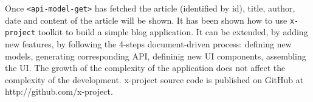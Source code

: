 Once \texttt{<api-model-get>} has fetched the article (identified by id), title, author, date and content of the article will be shown. It has been shown how to use \texttt{x-project} toolkit to build a simple blog application. It can be extended, by adding new features, by following the 4-steps document-driven process: defining new models, generating corresponding API, defininig new UI components, assembling the UI. The growth of the complexity of the application does not affect the complexity of the development. x-project source code is published on GitHub at http://github.com/x-project.

